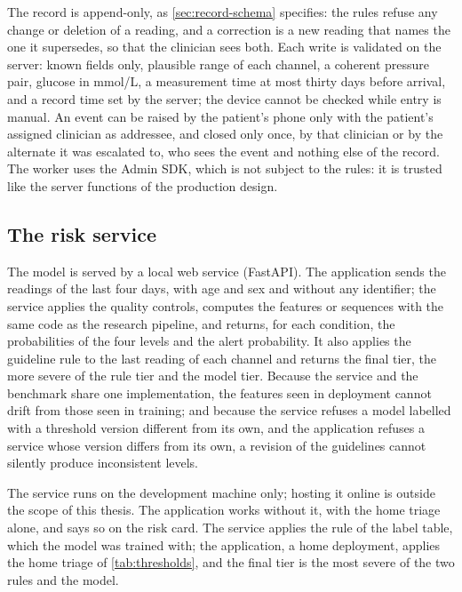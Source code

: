 The record is append-only, as \cref{sec:record-schema} specifies: the rules refuse any change or deletion of a reading, and a correction is a new reading that names the one it supersedes, so that the clinician sees both. Each write is validated on the server: known fields only, plausible range of each channel, a coherent pressure pair, glucose in mmol/L, a measurement time at most thirty days before arrival, and a record time set by the server; the device cannot be checked while entry is manual. An event can be raised by the patient's phone only with the patient's assigned clinician as addressee, and closed only once, by that clinician or by the alternate it was escalated to, who sees the event and nothing else of the record. The worker uses the Admin SDK, which is not subject to the rules: it is trusted like the server functions of the production design.

\subsection{The risk service}\label{sec:risk-service}\label{sec:functions}\label{sec:sweeps}

The model is served by a local web service (FastAPI). The application sends the readings of the last four days, with age and sex and without any identifier; the service applies the quality controls, computes the features or sequences with the same code as the research pipeline, and returns, for each condition, the probabilities of the four levels and the alert probability. It also applies the guideline rule to the last reading of each channel and returns the final tier, the more severe of the rule tier and the model tier. Because the service and the benchmark share one implementation, the features seen in deployment cannot drift from those seen in training; and because the service refuses a model labelled with a threshold version different from its own, and the application refuses a service whose version differs from its own, a revision of the guidelines cannot silently produce inconsistent levels.

The service runs on the development machine only; hosting it online is outside the scope of this thesis. The application works without it, with the home triage alone, and says so on the risk card. The service applies the rule of the label table, which the model was trained with; the application, a home deployment, applies the home triage of \cref{tab:thresholds}, and the final tier is the most severe of the two rules and the model.

